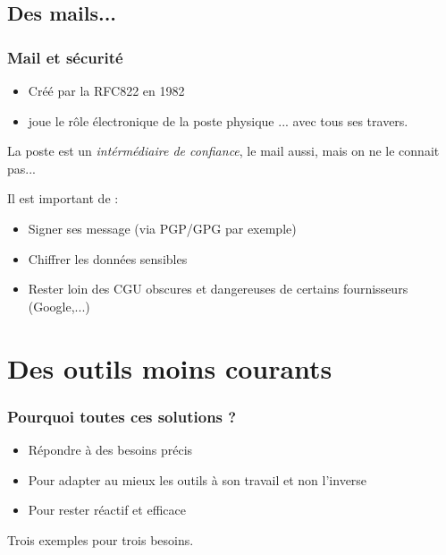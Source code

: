 \documentclass{beamer}
\begin{document}
\subsection{Des mails...} %

\begin{frame}
    \frametitle{Mail et sécurité}

    \begin{itemize}
        \item Créé par la RFC822 en 1982
        \item joue le rôle électronique de la poste physique ... avec tous ses travers.
    \end{itemize}

    \pause{}
    
    La poste est un \textit{intérmédiaire de confiance}, le mail aussi, mais on ne le connait pas...

    \pause{}

    Il est important de :

    \begin{itemize}
        \item Signer ses message (via PGP/GPG par exemple)
        \item Chiffrer les données sensibles
        \item Rester loin des CGU obscures et dangereuses de certains fournisseurs (Google,...)
    \end{itemize}
\end{frame}

\section{Des outils moins courants} %

\begin{frame}
    \frametitle{Pourquoi toutes ces solutions ?}

    \begin{itemize}
        \item Répondre à des besoins précis
        \item Pour adapter au mieux les outils à son travail et non l'inverse
        \item Pour rester réactif et efficace
    \end{itemize}

    \pause{}

    Trois exemples pour trois besoins.
\end{frame}
\end{document}
